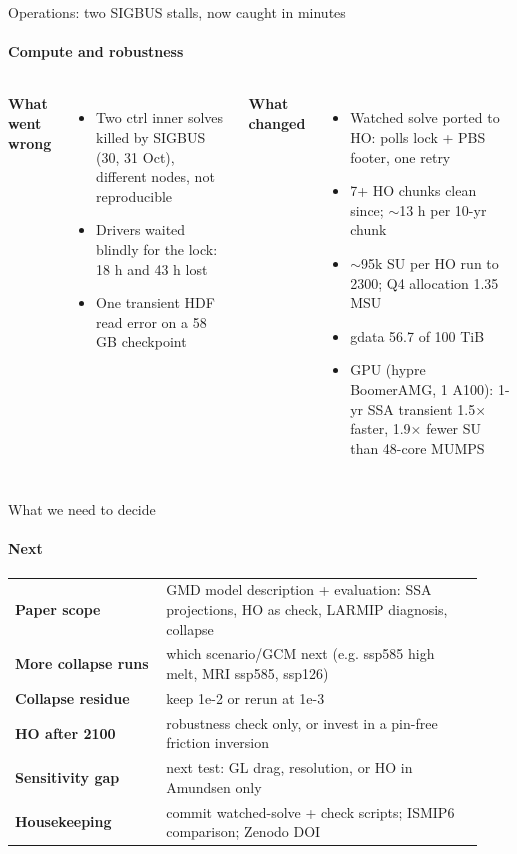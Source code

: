 \documentclass[aspectratio=169,10pt]{beamer}
\makeatletter
\newcommand{\serif}{\fontfamily{qpl}\selectfont}
\newcommand{\source}[1]{\gdef\beamer@shortsource{#1}}
\gdef\beamer@shortsource{}
\newcommand{\nosource}{\source{}}
\makeatother
\begin{document}
\nosource
\begin{frame}{Operations: two SIGBUS stalls, now caught in minutes}
\framesubtitle{Compute and robustness}
\vspace{2mm}\small
\begin{columns}[T]
{\serif\large\bfseries\color{navy}What went wrong}
\begin{itemize}
\item Two ctrl inner solves killed by SIGBUS (30, 31 Oct), different nodes, not reproducible
\item Drivers waited blindly for the lock: 18 h and 43 h lost
\item One transient HDF read error on a 58 GB checkpoint
\end{itemize}
{\serif\large\bfseries\color{navy}What changed}
\begin{itemize}
\item Watched solve ported to HO: polls lock + PBS footer, one retry
\item 7+ HO chunks clean since; $\sim$13 h per 10-yr chunk
\item $\sim$95k SU per HO run to 2300; Q4 allocation 1.35 MSU
\item gdata 56.7 of 100 TiB
\item GPU (hypre BoomerAMG, 1 A100): 1-yr SSA transient 1.5$\times$ faster, 1.9$\times$ fewer SU than 48-core MUMPS
\end{itemize}
\end{columns}
\end{frame}

{
\begin{frame}{What we need to decide}
\framesubtitle{Next}
\vspace{2mm}\small
\renewcommand{\arraystretch}{1.35}
\begin{tabular}{@{}p{0.3\linewidth}p{0.63\linewidth}@{}}
\toprule
{\bfseries\color{navy}Paper scope} & GMD model description + evaluation: SSA projections, HO as check, LARMIP diagnosis, collapse\\
{\bfseries\color{navy}More collapse runs} & which scenario/GCM next (e.g. ssp585 high melt, MRI ssp585, ssp126)\\
{\bfseries\color{navy}Collapse residue} & keep 1e-2 or rerun at 1e-3\\
{\bfseries\color{navy}HO after 2100} & robustness check only, or invest in a pin-free friction inversion\\
{\bfseries\color{navy}Sensitivity gap} & next test: GL drag, resolution, or HO in Amundsen only\\
{\bfseries\color{navy}Housekeeping} & commit watched-solve + check scripts; ISMIP6 comparison; Zenodo DOI\\
\bottomrule
\end{tabular}
\end{frame}}
\end{document}
